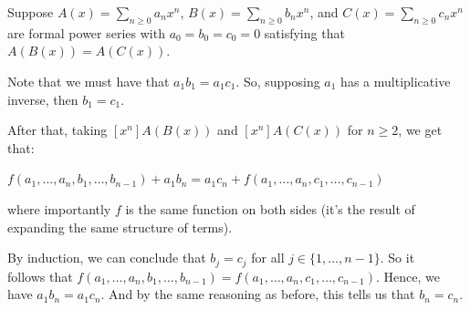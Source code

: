 \documentclass{book}
\newcommand{\exOne}{%
   \color{Purple}%
   \fontsize{13}{15}\selectfont%
}
\newenvironment{myIndent}{%
   \begin{adjustwidth}{2.5em}{0em}%
}{%
   \end{adjustwidth}%
}
\newcommand{\mySepTwo}[1][.]{%
   {\noindent\color{#1}{\rule{6.5in}{0.5mm}}}\\%
}
\newcommand{\retTwo}{\hfill\bigbreak}
\begin{document}
\begin{myIndent}\exOne
   Suppose $A(x) = \sum\limits_{n \geq 0}a_nx^n$, $B(x)  = \sum\limits_{n \geq 0}b_nx^n$, and $C(x) = \sum\limits_{n \geq 0}c_nx^n$ are formal power series with $a_0 = b_0 = c_0 = 0$ satisfying that $A(B(x)) = A(C(x))$.\retTwo

   Note that we must have that $a_1b_1 = a_1c_1$. So, supposing $a_1$ has a multiplicative inverse, then $b_1 = c_1$.\newpage

   After that, taking $[x^n]A(B(x))$ and $[x^n]A(C(x))$ for $n \geq 2$, we get that:\\ [-8pt]

   {\centering $f(a_1, \ldots, a_n, b_1, \ldots, b_{n-1}) + a_1b_n = a_1c_n + f(a_1, \ldots, a_n, c_1, \ldots, c_{n-1})$\\ [6pt]\par}

   where importantly $f$ is the same function on both sides (it's the result of expanding the same structure of terms).\retTwo

   By induction, we can conclude that $b_j = c_j$ for all $j \in \{1, \ldots, n-1\}$. So it\\ follows that $f(a_1, \ldots, a_n, b_1, \ldots, b_{n-1}) = f(a_1, \ldots, a_n, c_1, \ldots, c_{n-1})$. Hence, we have $a_1b_n = a_1c_n$. And by the same reasoning as before, this tells us that $b_n = c_n$.\retTwo
\end{myIndent}

\mySepTwo
\end{document}
